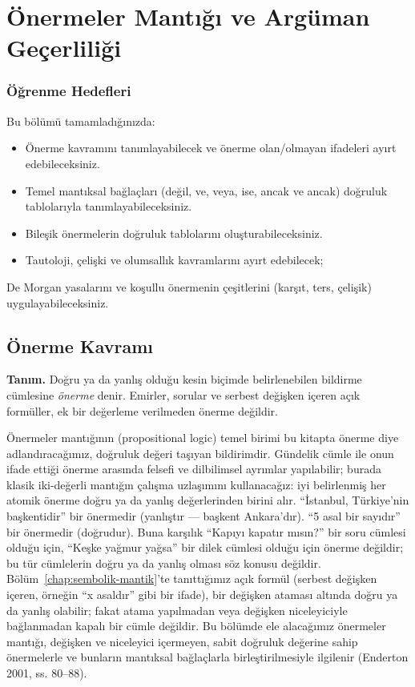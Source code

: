 \chapter{Önermeler Mantığı ve Argüman Geçerliliği}
\label{chap:onermeler-mantigi}


\subsection*{Öğrenme Hedefleri}

Bu bölümü tamamladığınızda:

\begin{itemize}\setlength{\itemsep}{2pt}\setlength{\parskip}{0pt}
\item Önerme kavramını tanımlayabilecek ve önerme olan/olmayan ifadeleri ayırt edebileceksiniz.
\item Temel mantıksal bağlaçları (değil, ve, veya, ise, ancak ve ancak) doğruluk tablolarıyla tanımlayabileceksiniz.
\item Bileşik önermelerin doğruluk tablolarını oluşturabileceksiniz.
\item Tautoloji, çelişki ve olumsallık kavramlarını ayırt edebilecek;
\end{itemize}

De Morgan yasalarını ve koşullu önermenin çeşitlerini (karşıt, ters, çelişik) uygulayabileceksiniz.

\section{Önerme Kavramı}

\begin{tcolorbox}[bookbox,colback=cDef]
\textbf{\textsf{\textcolor{cAcc}{Tanım.}}}\quad
Doğru ya da yanlış olduğu kesin biçimde belirlenebilen bildirme cümlesine \emph{önerme} denir. Emirler, sorular ve serbest değişken içeren açık formüller, ek bir değerleme verilmeden önerme değildir.
\end{tcolorbox}

Önermeler mantığının (propositional logic) temel birimi bu kitapta önerme diye adlandıracağımız, doğruluk değeri taşıyan bildirimdir. Gündelik cümle ile onun ifade ettiği önerme arasında felsefi ve dilbilimsel ayrımlar yapılabilir; burada klasik iki-değerli mantığın çalışma uzlaşımını kullanacağız: iyi belirlenmiş her atomik önerme doğru ya da yanlış değerlerinden birini alır. “İstanbul, Türkiye’nin başkentidir” bir önermedir (yanlıştır — başkent Ankara’dır). “5 asal bir sayıdır” bir önermedir (doğrudur). Buna karşılık “Kapıyı kapatır mısın?” bir soru cümlesi olduğu için, “Keşke yağmur yağsa” bir dilek cümlesi olduğu için önerme değildir; bu tür cümlelerin doğru ya da yanlış olması söz konusu değildir. Bölüm~\ref{chap:sembolik-mantik}’te tanıttığımız açık formül (serbest değişken içeren, örneğin “x asaldır” gibi bir ifade), bir değişken ataması altında doğru ya da yanlış olabilir; fakat atama yapılmadan veya değişken niceleyiciyle bağlanmadan kapalı bir cümle değildir. Bu bölümde ele alacağımız önermeler mantığı, değişken ve niceleyici içermeyen, sabit doğruluk değerine sahip önermelerle ve bunların mantıksal bağlaçlarla birleştirilmesiyle ilgilenir (Enderton 2001, ss. 80–88).

